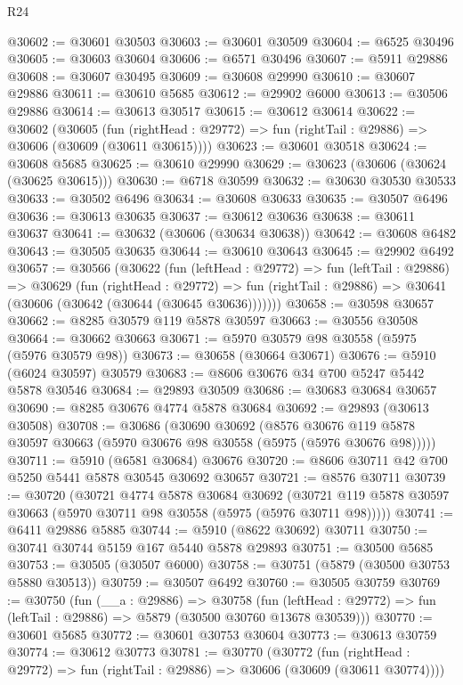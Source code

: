\begin{lexlean}{R24}
\begin{coremodule}
@30602 := @30601 @30503
@30603 := @30601 @30509
@30604 := @6525 @30496
@30605 := @30603 @30604
@30606 := @6571 @30496
@30607 := @5911 @29886
@30608 := @30607 @30495
@30609 := @30608 @29990
@30610 := @30607 @29886
@30611 := @30610 @5685
@30612 := @29902 @6000
@30613 := @30506 @29886
@30614 := @30613 @30517
@30615 := @30612 @30614
@30622 := @30602
    (@30605
      (fun (rightHead : @29772) => fun (rightTail : @29886) => @30606 (@30609 (@30611 @30615))))
@30623 := @30601 @30518
@30624 := @30608 @5685
@30625 := @30610 @29990
@30629 := @30623 (@30606 (@30624 (@30625 @30615)))
@30630 := @6718 @30599
@30632 := @30630 @30530 @30533
@30633 := @30502 @6496
@30634 := @30608 @30633
@30635 := @30507 @6496
@30636 := @30613 @30635
@30637 := @30612 @30636
@30638 := @30611 @30637
@30641 := @30632 (@30606 (@30634 @30638))
@30642 := @30608 @6482
@30643 := @30505 @30635
@30644 := @30610 @30643
@30645 := @29902 @6492
@30657 := @30566
    (@30622
      (fun (leftHead : @29772) =>
      fun (leftTail : @29886) =>
      @30629
        (fun (rightHead : @29772) =>
        fun (rightTail : @29886) => @30641 (@30606 (@30642 (@30644 (@30645 @30636)))))))
@30658 := @30598 @30657
@30662 := @8285 @30579 @119 @5878 @30597
@30663 := @30556 @30508
@30664 := @30662 @30663
@30671 := @5970 @30579 @98 @30558 (@5975 (@5976 @30579 @98))
@30673 := @30658 (@30664 @30671)
@30676 := @5910 (@6024 @30597) @30579
@30683 := @8606 @30676 @34 @700 @5247 @5442 @5878 @30546
@30684 := @29893 @30509
@30686 := @30683 @30684 @30657
@30690 := @8285 @30676 @4774 @5878 @30684
@30692 := @29893 (@30613 @30508)
@30708 := @30686
    (@30690
      @30692
      (@8576 @30676 @119 @5878 @30597 @30663 (@5970 @30676 @98 @30558 (@5975 (@5976 @30676 @98)))))
@30711 := @5910 (@6581 @30684) @30676
@30720 := @8606 @30711 @42 @700 @5250 @5441 @5878 @30545 @30692 @30657
@30721 := @8576 @30711
@30739 := @30720
    (@30721
      @4774
      @5878
      @30684
      @30692
      (@30721 @119 @5878 @30597 @30663 (@5970 @30711 @98 @30558 (@5975 (@5976 @30711 @98)))))
@30741 := @6411 @29886 @5885
@30744 := @5910 (@8622 @30692) @30711
@30750 := @30741 @30744 @5159 @167 @5440 @5878 @29893
@30751 := @30500 @5685
@30753 := @30505 (@30507 @6000)
@30758 := @30751 (@5879 (@30500 @30753 @5880 @30513))
@30759 := @30507 @6492
@30760 := @30505 @30759
@30769 := @30750
    (fun (__a : @29886) =>
    @30758
      (fun (leftHead : @29772) => fun (leftTail : @29886) => @5879 (@30500 @30760 @13678 @30539)))
@30770 := @30601 @5685
@30772 := @30601 @30753 @30604
@30773 := @30613 @30759
@30774 := @30612 @30773
@30781 := @30770
    (@30772
      (fun (rightHead : @29772) => fun (rightTail : @29886) => @30606 (@30609 (@30611 @30774))))

\end{coremodule}
\end{lexlean}
